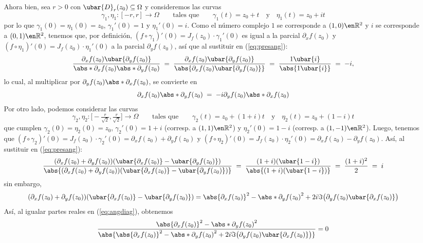 \begin{sol}
\begin{enumerate}[label=(\alph*),leftmargin=1.5em]
Ahora bien, sea $r>0$ con $\ubar{D}_r(z_0) \subseteq \Omega$ y consideremos las curvas 
\[
\gamma_1,\eta_1\colon [-r,r] \to \Omega
\qquad\text{tales que}\qquad
\gamma_1(t) = z_0 + t \quad\text{y}\quad \eta_1(t) = z_0 + it
\]
por lo que $\gamma_1(0) = \eta_1(0) = z_0$, $\gamma_1'(0) = 1$ y $\eta_1'(0)=i$. Como el número complejo $1$ se corresponde a $(1,0)\en\mathbb{R}^2$ y $i$ se corresponde a $(0,1)\en\mathbb{R}^2$, tenemos que, por definición, $(f\circ\gamma_1)'(0) = J_f(z_0)\cdot\gamma_1'(0)$ es igual a la parcial $\partial_xf(z_0)$ y $(f\circ\eta_1)'(0) = J_f(z_0)\cdot\eta_1'(0)$ a la parcial $\partial_yf(z_0)$, así que al sustituir en (\ref{eq:presang}):
\[
\frac{ \partial_xf(z_0)\ubar{\partial_yf(z_ 0)} }{ \abs*{\partial_xf(z_0)}\abs*{\partial_yf(z_0)} }
\;=\; \frac{ \partial_xf(z_0)\ubar{\partial_yf(z_ 0)} }{ \abs{\partial_xf(z_0)\ubar{\partial_yf(z_ 0)}} }
\;=\; \frac{ 1\ubar{i} }{ \abs{1\ubar{i}} } \;=\; -i,
\]
lo cual, al multiplicar por $\partial_yf(z_0)\abs*{\partial_xf(z_0)}$, se convierte en
\begin{equation}\label{eq:casiCR}
\partial_xf(z_0)\abs*{\partial_yf(z_0)} \;=\; -i\partial_yf(z_0)\abs*{\partial_xf(z_0)}
\end{equation}
Por otro lado, podemos considerar las curvas
\[
\gamma_2,\eta_2\colon\bigl[-\tfrac{r}{\sqrt{2}},\tfrac{r}{\sqrt{2}}\bigr] \to \Omega
\qquad\text{tales que}\qquad
\gamma_2(t) = z_0 + (1+i)t \quad\text{y}\quad \eta_2(t) = z_0 + (1-i)t
\]
que cumplen $\gamma_2(0)=\eta_2(0) = z_0$, $\gamma_2'(0) = 1+i$ (corresp. a $(1,1)\en\mathbb{R}^2$) y $\eta_2'(0) = 1-i$ (corresp. a $(1,-1)\en\mathbb{R}^2$). Luego, tenemos que $(f\circ\gamma_2)'(0) = J_f(z_0)\cdot\gamma_2'(0) = \partial_xf(z_0)+\partial_yf(z_0)$ y $(f\circ\eta_2)'(0) = J_f(z_0)\cdot\eta_2'(0) = \partial_xf(z_0)-\partial_yf(z_0)$. Así, al sustituir en (\ref{eq:presang}):
\begin{equation}\label{eq:angdiag}
\frac{ (\partial_xf(z_0)+\partial_yf(z_0))(\ubar{\partial_xf(z_0)} -\ubar{\partial_yf(z_0)}) }{ \abs{(\partial_xf(z_0)+\partial_yf(z_0))(\ubar{\partial_xf(z_0)} -\ubar{\partial_yf(z_0)})} }
\;=\; \frac{ (1+i)(\ubar{1-i}) }{ \abs{(1+i)(\ubar{1-i})} }
\;=\; \frac{ (1+i)^2 }{2}
\;=\; i
\end{equation}
sin embargo, 
\[
(\partial_xf(z_0)+\partial_yf(z_0))(\ubar{\partial_xf(z_0)} -\ubar{\partial_yf(z_0)}) = \abs{\partial_xf(z_0)}^2-\abs*{\partial_yf(z_0)}^2+2i\Im\bigl(\partial_yf(z_0)\ubar{\partial_xf(z_0)}\bigr)
\]
Así, al igualar partes reales en (\ref{eq:angdiag}), obtenemos
\[
\frac{ \abs{\partial_xf(z_0)}^2-\abs*{\partial_yf(z_0)}^2 }{ \abs{\abs{\partial_xf(z_0)}^2-\abs*{\partial_yf(z_0)}^2+2i\Im\bigl(\partial_yf(z_0)\ubar{\partial_xf(z_0)}\bigr)} } = 0
\]
\end{enumerate}
\end{sol}

